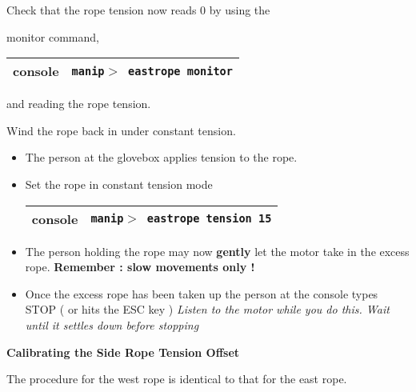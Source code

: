 \begin{enumerate}
\checkitem Check that the rope tension now reads 0 by using the

  monitor command,
  \begin{center}
  \begin{tabular}{|l|l|}
  \hline
  console & {\tt manip$>$ eastrope monitor} \\
  \hline
  \end{tabular}
  \end{center}
  and reading the rope tension.

\checkitem Wind the rope back in under constant tension.
\begin{itemize}
\item The person at the glovebox applies tension to the rope.
\item Set the rope in constant tension mode
  \begin{center}
  \begin{tabular}{|l|l|}
  \hline
  console & {\tt manip$>$ eastrope tension 15} \\
  \hline
  \end{tabular}
  \end{center}
\item The person holding the rope may now {\bf gently} let the motor take in the excess
rope. {\bf Remember : slow movements only !} 
\item Once the excess rope has been taken up the person at the console types STOP ( or hits the ESC key )
\small
{\em Listen to the motor while you do this. Wait until it settles down before stopping}
\normalsize

\end{itemize}

  
\end{enumerate}


\vspace*{0.25in}
\noindent
{\bf Calibrating the  Side Rope Tension Offset}

The procedure for the west rope is identical to that for
the east rope.

  




